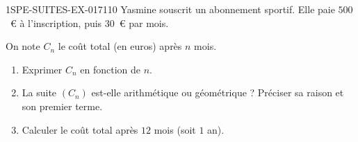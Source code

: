 \begin{exercice}{1SPE-SUITES-EX-017}{1}{10}
Yasmine souscrit un abonnement sportif. Elle paie $500$~€ à l'inscription, puis $30$~€ par mois.

On note $C_n$ le coût total (en euros) après $n$ mois.
\begin{enumerate}
  \item Exprimer $C_n$ en fonction de $n$.
  \item La suite $(C_n)$ est-elle arithmétique ou géométrique ? Préciser sa raison et son premier terme.
  \item Calculer le coût total après $12$ mois (soit $1$ an).
\end{enumerate}
\end{exercice}
